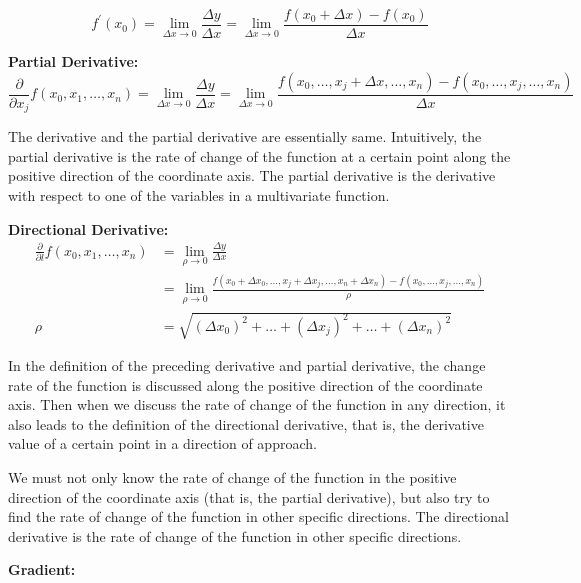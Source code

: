 \begin{equation*}
f^{\prime}(x_0) = \lim_{\Delta x \to 0} \frac{\Delta y}{\Delta x} = \lim_{\Delta x \to 0} \frac{f(x_0 + \Delta x) - f(x_0)}{\Delta x}      
\end{equation*}

\textbf{Partial Derivative:}\\

\begin{equation*}
 \frac{\partial }{\partial x_j}f(x_0,x_1,\dots,x_n)= \lim_{\Delta x \to 0} \frac{\Delta y}{\Delta x} = \lim_{\Delta x \to 0} 
 \frac{f(x_0, \dots ,x_j + \Delta x,\dots,x_n) - f(x_0, \dots ,x_j,\dots,x_n)}{\Delta x}      
\end{equation*}

The derivative and the partial derivative are essentially same. Intuitively, the partial derivative is the rate of change of the function at a certain point along the positive direction of the coordinate axis. The partial derivative is the derivative with respect to one of the variables in a multivariate function.

\textbf{Directional Derivative:}\\

\begin{align*}
 \frac{\partial }{\partial l}f(x_0,x_1,\dots,x_n)&= \lim_{\rho \to 0} \frac{\Delta y}{\Delta x} \\
 &= \lim_{\rho \to 0} 
 \frac{f(x_0+\Delta x_0, \dots ,x_j + \Delta x_j,\dots,x_n+\Delta x_n) - f(x_0, \dots ,x_j,\dots,x_n)}{\rho}     \\
  \rho &= \sqrt{(\Delta x_0)^2 + \dots+(\Delta x_j)^2+\dots+(\Delta x_n)^2}
\end{align*}

In the definition of the preceding derivative and partial derivative, the change rate of the function is discussed along the positive direction of the coordinate axis. Then when we discuss the rate of change of the function in any direction, it also leads to the definition of the directional derivative, that is, the derivative value of a certain point in a direction of approach.

We must not only know the rate of change of the function in the positive direction of the coordinate axis (that is, the partial derivative), but also try to find the rate of change of the function in other specific directions. The directional derivative is the rate of change of the function in other specific directions.

\textbf{Gradient:}\\

